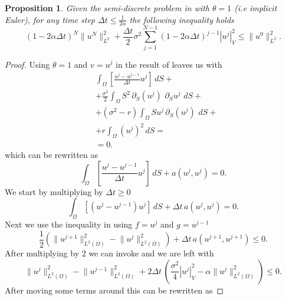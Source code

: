 \documentclass{article}
\newtheorem{prop}[thm]{Proposition}
\newcommand{\argwrapsquare}[1]{\left[#1\right]}
\newcommand{\intS}[1]{\ensuremath{\int_{\Omega}#1 \, dS}}
\newcommand{\intSlong}[1]{\intS{\argwrapsquare{#1}}}
\newcommand{\darg}[2]{\ensuremath{\, \partial_{#2}#1} \, }
\newcommand{\dS}[1]{\ensuremath{\darg{#1}{S}}}
\newcommand{\sigmafrac}{\ensuremath{\frac{\sigma^2}{2}}}
\newcommand{\seminormsq}[1]{\ensuremath{|#1|_V^2}}
\newcommand{\normsq}[1]{\ensuremath{\|#1\|_{L^2(\Omega)}^2}}
\begin{document}
\begin{prop}
    Given the semi-discrete problem in  with $\theta = 1$ (i.e implicit Euler), for any time step $\Delta t \leq \frac{1}{2 \alpha}$ the following inequality holds\\
    \begin{equation*}
        (1 - 2\alpha \Delta t)^N \| u^N \|_{L^2}^2 + \frac{\Delta t}{2} \sigma^2 \sum_{j=1}^{N-1} (1 - 2\alpha \Delta t)^{j-1} \seminormsq{u^j} \leq \| u^0 \|_{L^2}^2.
        \label{eq:placeholder_label}
    \end{equation*}
\end{prop}
\begin{proof}
    Using $\theta = 1$ and $v = u^j$ in the result of  leaves us with
    \begin{align*}
        &\intSlong{\frac{u^{j} - u^{j-1}}{\Delta t}  u^{j}} + \\
        &+\sigmafrac \intS{S^2 \dS{\left(u^{j}\right)} \dS{u^{j}}} + \\
        &+ (\sigma^2 - r) \intS{S u^{j} \dS{\left(u^{j}\right)}} + \\
        &+r \intS{(u^{j})^2} =\\
        &=0.
        \end{align*}
    which can be rewritten as
    \begin{equation}\label{eq:discret_time_and_a_u_j+1}
        \intSlong{\frac{u^{j} - u^{j-1}}{\Delta t}  u^{j}} + a(u^{j},u^{j}) = 0.
    \end{equation}
   We start by multiplying  by $\Delta t \geq 0$
   \begin{equation*}
    \intSlong{(u^{j} - u^{j-1})  u^{j}} + \Delta t \,a(u^{j},u^{j}) = 0.
    \end{equation*}
    Next we use the inequality in  using $f = u^{j}$ and $g =u^{j-1}$
    \begin{equation*}
        \frac{1}{2}\left( \normsq{u^{j+1}} - \normsq{u^{j}} \right) + \Delta t \,a(u^{j+1},u^{j+1}) \leq 0.
    \end{equation*}
    After multiplying by $2$ we can invoke  and we are left with
    \begin{equation*}
         \normsq{u^{j}} - \normsq{u^{j-1}} + 2\Delta t \, \left( \frac{\sigma^2}{4} \seminormsq{u^{j}} - \alpha \normsq{u^{j}} \right) \leq 0.
    \end{equation*}
    After moving some terms around this can be rewritten as

\end{proof}
\end{document}
